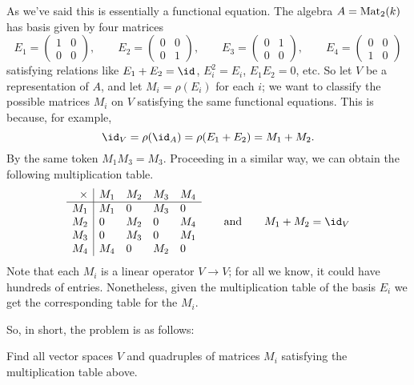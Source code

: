 \documentclass[11pt]{scrreprt}
\begin{document}
As we've said this is essentially a functional equation.
The algebra $A = \mathrm{Mat}_2(k)$ has basis given by four matrices
\[
	E_1 = \begin{pmatrix} 1 & 0 \\ 0 & 0 \end{pmatrix},
	\qquad
	E_2 = \begin{pmatrix} 0 & 0 \\ 0 & 1 \end{pmatrix},
	\qquad
	E_3 = \begin{pmatrix} 0 & 1 \\ 0 & 0 \end{pmatrix},
	\qquad
	E_4 = \begin{pmatrix} 0 & 0 \\ 1 & 0 \end{pmatrix}
\]
satisfying relations like $E_1 + E_2 = \id$, $E_i^2 = E_i$, $E_1E_2 = 0$, etc.
So let $V$ be a representation of $A$, and let $M_i = \rho(E_i)$ for each $i$;
we want to classify the possible matrices $M_i$ on $V$
satisfying the same functional equations.
This is because, for example,
\[ \id_V = \rho(\id_A) = \rho(E_1+E_2) = M_1 + M_2. \]
By the same token $M_1M_3 = M_3$.
Proceeding in a similar way, we can obtain the following multiplication table.
\[
	\begin{array}{r|llll}
		\times & M_1 & M_2 & M_3 & M_4 \\ \hline
		M_1 & M_1 & 0 & M_3 & 0 \\
		M_2 & 0 & M_2 & 0 & M_4 \\
		M_3 & 0 & M_3 & 0 & M_1 \\
		M_4 & M_4 & 0 & M_2 & 0
	\end{array}
	\qquad \text{and} \qquad
	M_1 + M_2 = \id_V
\]
Note that each $M_i$ is a linear operator $V \to V$;
for all we know, it could have hundreds of entries.
Nonetheless, given the multiplication table of the basis $E_i$
we get the corresponding table for the $M_i$.

So, in short, the problem is as follows:
\begin{moral}
	Find all vector spaces $V$ and quadruples of matrices $M_i$
	satisfying the multiplication table above.
\end{moral}
\end{document}

